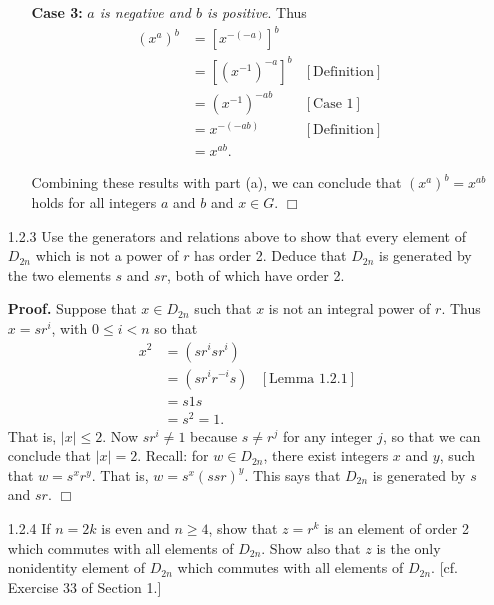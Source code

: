 \documentclass[9pt]{article}
\newcommand{\qed}{\hfill \ensuremath{\Box}}
\begin{document}
\begin{enumerate}
\begin{enumerate}
               \textbf{Case 3:} \textit{$a$ is negative and $b$ is positive}. 
               Thus
               \begin{align*}
                  (x^a)^b &= [x^{-(-a)}]^b \\
                          &= [(x^{-1})^{-a}]^b &[\text{Definition}] \\
                          &= (x^{-1})^{-ab} &[\text{Case 1}] \\
                          &= x^{-(-ab)} &[\text{Definition}] \\
                          &= x^{ab}.
               \end{align*}

               Combining these results with part (a), we can conclude that
               $(x^a)^b = x^{ab}$ holds for all integers $a$ and $b$ and
               $x \in G$. \qed
      \end{enumerate}
   \item[1.2.3]   Use the generators and relations above to show that every
                  element of $D_{2n}$ which is not a power of $r$ has order 2.
                  Deduce that $D_{2n}$ is generated by the two elements $s$ and
                  $sr$, both of which have order 2.
                  
      \textbf{Proof.} Suppose that $x \in D_{2n}$ such that $x$ is not an
      integral power of $r$. Thus $x = sr^i$, with $0 \le i < n$ so that
      \begin{align*}
         x^2 &= (sr^isr^i) \\
             &= (sr^ir^{-i}s) &[\text{Lemma 1.2.1}] \\
             &= s1s \\
             &= s^2 = 1.
      \end{align*}
      That is, $|x| \le 2$. Now $sr^i \neq 1$ because $s \neq r^j$ for any
      integer $j$, so that we can conclude that $|x| = 2$. Recall: for
      $w \in D_{2n}$, there exist integers $x$ and $y$, such that $w = s^xr^y$.
      That is, $w = s^x(ssr)^y$. This says that $D_{2n}$ is generated by $s$ and
      $sr$. \qed
   \item[1.2.4]   If $n = 2k$ is even and $n \ge 4$, show that $z = r^k$ is an
                  element of order 2 which commutes with all elements of
                  $D_{2n}$. Show also that $z$ is the only nonidentity element
                  of $D_{2n}$ which commutes with all elements of $D_{2n}$. [cf.
                  Exercise 33 of Section 1.]
                  

\end{enumerate}
\end{document}
